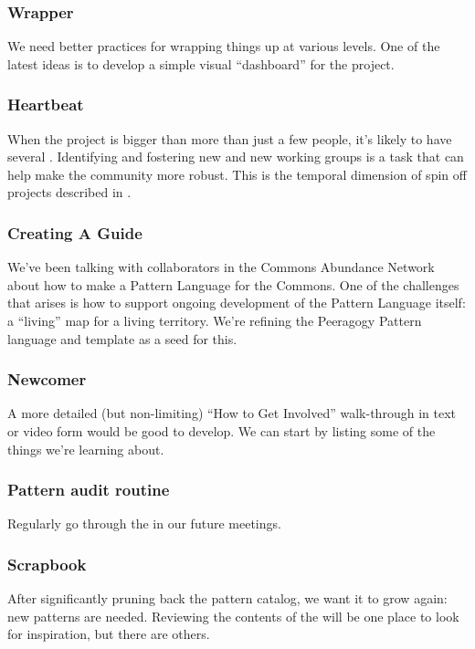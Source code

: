\subsubsection*{Wrapper}  We need better practices for wrapping things up at
various levels.  One of the latest ideas is to develop a simple visual
``dashboard'' for the project.

\subsubsection*{Heartbeat} When the project is bigger than more than just a few people, it's likely to have several .  Identifying and fostering new  and new working groups is a task that can help make the community more robust.  This is the temporal dimension of spin off projects described in .

\subsubsection*{Creating A Guide} We’ve been talking with collaborators in the Commons Abundance Network
about how to make a Pattern Language for the Commons. One of the
challenges that arises is how to support ongoing development of the
Pattern Language itself: a “living” map for a living territory. We’re
refining the Peeragogy Pattern language and template as a seed for this.

\subsubsection*{Newcomer} A more detailed (but non-limiting) ``How to Get Involved'' walk-through in text or video form would be good to develop. We can start by listing some of the things we're learning about.

\subsubsection*{Pattern audit routine} Regularly go through the  in our future meetings.

\subsubsection*{Scrapbook} After significantly pruning back the pattern catalog, we want it to grow again: new patterns are needed.  Reviewing the contents of the  will be one place to look for inspiration, but there are others.





